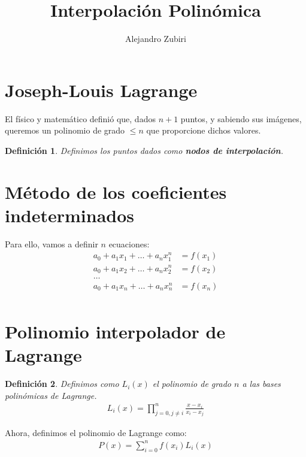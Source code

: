 \documentclass{article}
\author{Alejandro Zubiri}
\title{Interpolación Polinómica}
\newtheorem{defi}{Definición}
\begin{document}
\maketitle
\section{Joseph-Louis Lagrange}
El físico y matemático definió que, dados $n+1$ puntos, y sabiendo sus imágenes, queremos un polinomio de grado $\leq n$ que proporcione dichos valores.
\begin{defi}
	Definimos los puntos dados como \textbf{nodos de interpolación}.
\end{defi}
\section{Método de los coeficientes indeterminados}
Para ello, vamos a definir $n$ ecuaciones:
\begin{equation}
	\begin{split}
		a_0 +a_1x_1+\dots+a_nx_1^n&=f(x_1)\\
		a_0+a_1x_2+\dots + a_nx_2^n &= f(x_2)\\
		\dots\\
		a_0+a_1x_n+\dots+ a_nx_n^n &= f(x_n)\\
	\end{split}
\end{equation}
\section{Polinomio interpolador de Lagrange}
\begin{defi}
	Definimos como $L_i(x)$ el polinomio de grado $n$ a las bases polinómicas de Lagrange.
	\begin{equation}
		\begin{split}
			L_i(x)= \prod_{j=0, j \neq i}^n \frac{x-x_i}{x_i-x_j}
		\end{split}
	\end{equation}
\end{defi}
Ahora, definimos el polinomio de Lagrange como:
\begin{equation}
	\begin{split}
		P(x)=\sum_{i=0}^n f(x_i)L_i(x)
	\end{split}
\end{equation}
\end{document}
